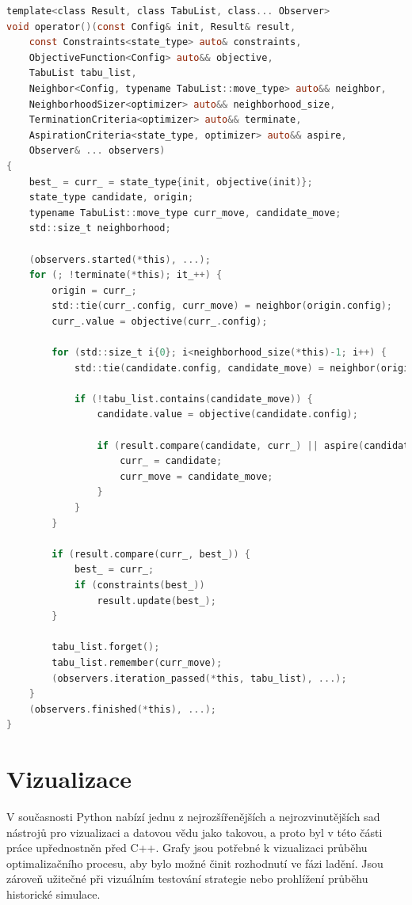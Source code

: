 \begin{lstlisting}[caption={~Implementace genetického algoritmu},label={lst:tabu:search},captionpos=t,abovecaptionskip=-\medskipamount,belowcaptionskip=\medskipamount,language=C]
template<class Result, class TabuList, class... Observer>
void operator()(const Config& init, Result& result,
    const Constraints<state_type> auto& constraints,
    ObjectiveFunction<Config> auto&& objective,
    TabuList tabu_list,
    Neighbor<Config, typename TabuList::move_type> auto&& neighbor,
    NeighborhoodSizer<optimizer> auto&& neighborhood_size,
    TerminationCriteria<optimizer> auto&& terminate,
    AspirationCriteria<state_type, optimizer> auto&& aspire,
    Observer& ... observers)
{
    best_ = curr_ = state_type{init, objective(init)};
    state_type candidate, origin;
    typename TabuList::move_type curr_move, candidate_move;
    std::size_t neighborhood;

    (observers.started(*this), ...);
    for (; !terminate(*this); it_++) {
        origin = curr_;
        std::tie(curr_.config, curr_move) = neighbor(origin.config);
        curr_.value = objective(curr_.config);
        
        for (std::size_t i{0}; i<neighborhood_size(*this)-1; i++) {
            std::tie(candidate.config, candidate_move) = neighbor(origin.config);

            if (!tabu_list.contains(candidate_move)) {
                candidate.value = objective(candidate.config);

                if (result.compare(candidate, curr_) || aspire(candidate, *this)) {
                    curr_ = candidate;
                    curr_move = candidate_move;
                }
            }
        }

        if (result.compare(curr_, best_)) {
            best_ = curr_;
            if (constraints(best_))
                result.update(best_);
        }

        tabu_list.forget();
        tabu_list.remember(curr_move);
        (observers.iteration_passed(*this, tabu_list), ...);
    }
    (observers.finished(*this), ...);
}
\end{lstlisting}

\chapter{Vizualizace}
V současnosti Python nabízí jednu z nejrozšířenějších a nejrozvinutějších sad nástrojů pro vizualizaci a datovou vědu jako takovou, a proto byl v této části práce upřednostněn před C++.
Grafy jsou potřebné k vizualizaci průběhu optimalizačního procesu, aby bylo možné činit rozhodnutí ve fázi ladění.
Jsou zároveň užitečné při vizuálním testování strategie nebo prohlížení průběhu historické simulace.

